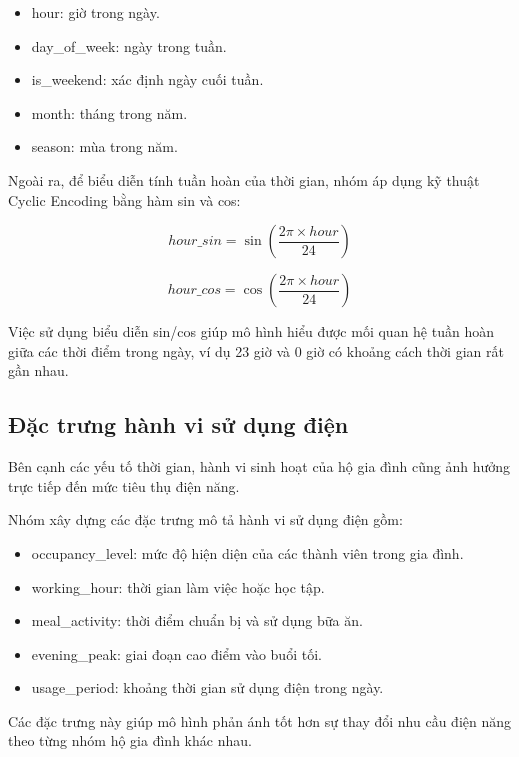 \begin{itemize}
\item hour: giờ trong ngày.
\item day\_of\_week: ngày trong tuần.
\item is\_weekend: xác định ngày cuối tuần.
\item month: tháng trong năm.
\item season: mùa trong năm.
\end{itemize}

Ngoài ra, để biểu diễn tính tuần hoàn của thời gian, nhóm áp dụng kỹ thuật Cyclic Encoding bằng hàm sin và cos:

\begin{equation}
hour\_sin = \sin\left(\frac{2\pi \times hour}{24}\right)
\end{equation}

\begin{equation}
hour\_cos = \cos\left(\frac{2\pi \times hour}{24}\right)
\end{equation}

Việc sử dụng biểu diễn sin/cos giúp mô hình hiểu được mối quan hệ tuần hoàn giữa các thời điểm trong ngày, ví dụ 23 giờ và 0 giờ có khoảng cách thời gian rất gần nhau.

\subsection{Đặc trưng hành vi sử dụng điện}

Bên cạnh các yếu tố thời gian, hành vi sinh hoạt của hộ gia đình cũng ảnh hưởng trực tiếp đến mức tiêu thụ điện năng.

Nhóm xây dựng các đặc trưng mô tả hành vi sử dụng điện gồm:

\begin{itemize}
\item occupancy\_level: mức độ hiện diện của các thành viên trong gia đình.
\item working\_hour: thời gian làm việc hoặc học tập.
\item meal\_activity: thời điểm chuẩn bị và sử dụng bữa ăn.
\item evening\_peak: giai đoạn cao điểm vào buổi tối.
\item usage\_period: khoảng thời gian sử dụng điện trong ngày.
\end{itemize}

Các đặc trưng này giúp mô hình phản ánh tốt hơn sự thay đổi nhu cầu điện năng theo từng nhóm hộ gia đình khác nhau.

